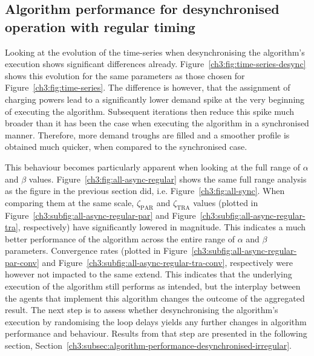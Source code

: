 \subsection{Algorithm performance for desynchronised operation with regular timing}
\label{ch3:subsec:algorithm-performance-desynchronised-regular}



Looking at the evolution of the time-series when desynchronising the algorithm's execution shows significant differences already.
Figure~\ref{ch3:fig:time-series-desync} shows this evolution for the same parameters as those chosen for Figure~\ref{ch3:fig:time-series}.
The difference is however, that the assignment of charging powers lead to a significantly lower demand spike at the very beginning of executing the algorithm.
Subsequent iterations then reduce this spike much broader than it has been the case when executing the algorithm in a synchronised manner.
Therefore, more demand troughs are filled and a smoother profile is obtained much quicker, when compared to the synchronised case.



This behaviour becomes particularly apparent when looking at the full range of $\alpha$ and $\beta$ values.
Figure~\ref{ch3:fig:all-async-regular} shows the same full range analysis as the figure in the previous section did, i.e. Figure~\ref{ch3:fig:all-sync}.
When comparing them at the same scale, $\zeta_\text{PAR}$ and $\zeta_\text{TRA}$ values (plotted in Figure~\ref{ch3:subfig:all-async-regular-par} and Figure~\ref{ch3:subfig:all-async-regular-tra}, respectively) have significantly lowered in magnitude.
This indicates a much better performance of the algorithm across the entire range of $\alpha$ and $\beta$ parameters.
Convergence rates (plotted in Figure~\ref{ch3:subfig:all-async-regular-par-conv} and Figure~\ref{ch3:subfig:all-async-regular-tra-conv}, respectively were however not impacted to the same extend.
This indicates that the underlying execution of the algorithm still performs as intended, but the interplay between the agents that implement this algorithm changes the outcome of the aggregated result.
The next step is to assess whether desynchronising the algorithm's execution by randomising the loop delays yields any further changes in algorithm performance and behaviour.
Results from that step are presented in the following section, Section~\ref{ch3:subsec:algorithm-performance-desynchronised-irregular}.

